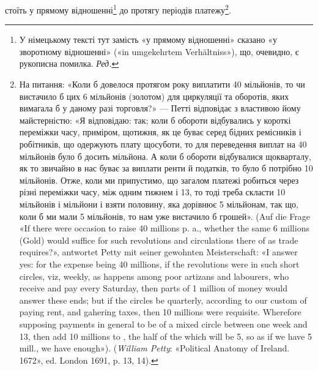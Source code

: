 стоїть у прямому відношенні\footnote*{
У німецькому тексті тут замість «у прямому відношенні» сказано
«у зворотному відношенні» («in umgekehrtem Verhältniss»), що, очевидно,
є рукописна помилка. \emph{Ред.}
} до протягу періодів платежу\footnote{
На питання: «Коли б довелося протягом року виплатити 40 мільйонів,
то чи вистачило б цих 6 мільйонів (золотом) для циркуляції та оборотів,
яких вимагала б у даному разі торговля?» — Петті відповідає з
властивою йому майстерністю: «Я відповідаю: так; коли б обороти відбувались
у короткі переміжки часу, приміром, щотижня, як це буває
серед бідних ремісників і робітників, що одержують плату щосуботи, то
для переведення виплат на 40 мільйонів було б досить  мільйона.
А коли б обороти відбувалися щокварталу, як то звичайно в нас буває
за виплати ренти й податків, то було б потрібно 10 мільйонів. Отже, коли
ми припустимо, що загалом платежі робиться через різні переміжки часу,
між одним тижнем і 13, то тоді треба скласти 10 мільйонів і  мільйони
і взяти половину, яка дорівнює 5 мільйонам, так що, коли б ми мали
5 мільйонів, то нам уже вистачило б грошей». (Auf die Frage «If there were
occasion to raise 40 millions p. a., whether the same 6 millions (Gold) would
suffice for such revolutions and circulations there of as trade requires?», antwortet
Petty mit seiner gewohnten Meisterschaft: «I answer yes: for the expense
being 40 millions, if the revolutions were in such short circles, viz, weekly,
as happens among poor artizans and labourers, who receive and pay every
Saturday, then  parts of 1 million of money would answer these ends;
but if the circles be quarterly, according to our custom of paying rent, and
gahering taxes, then 10 millions were requisite. Wherefore supposing payments
in general to be of a mixed circle between one week and 13, then add
10 millions to , the half of the which will be 5, so as if we have
5 mill., we have enough»). (\emph{William Petty}: «Political Anatomy of Ireland.
1672», ed. London 1691, p. 13, 14).
}.
